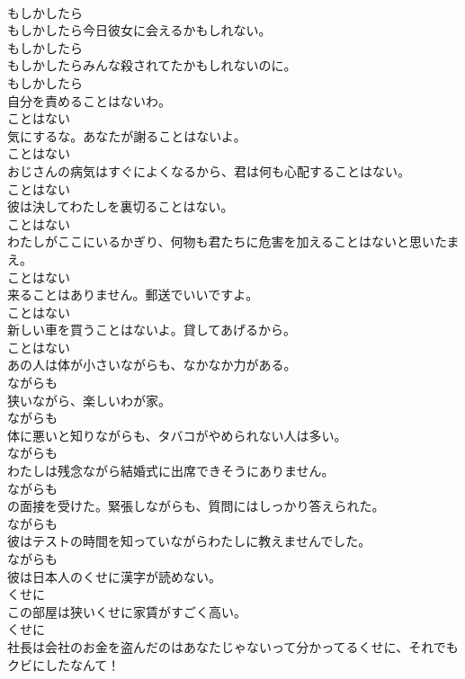 \documentclass[8pt]{extreport}
\begin{document}
\begin{CJK}{UTF8}{min}
\\	もしかしたら
\\	もしかしたら今日彼女に会えるかもしれない。	
\\	もしかしたら
\\	もしかしたらみんな殺されてたかもしれないのに。	
\\	もしかしたら
\\	自分を責めることはないわ。	
\\	ことはない
\\	気にするな。あなたが謝ることはないよ。	
\\	ことはない
\\	おじさんの病気はすぐによくなるから、君は何も心配することはない。	
\\	ことはない
\\	彼は決してわたしを裏切ることはない。	
\\	ことはない
\\	わたしがここにいるかぎり、何物も君たちに危害を加えることはないと思いたまえ。	
\\	ことはない
\\	来ることはありません。郵送でいいですよ。	
\\	ことはない
\\	新しい車を買うことはないよ。貸してあげるから。	
\\	ことはない
\\	あの人は体が小さいながらも、なかなか力がある。	
\\	ながらも
\\	狭いながら、楽しいわが家。	
\\	ながらも
\\	体に悪いと知りながらも、タバコがやめられない人は多い。	
\\	ながらも
\\	わたしは残念ながら結婚式に出席できそうにありません。	
\\	ながらも
\\	の面接を受けた。緊張しながらも、質問にはしっかり答えられた。	
\\	ながらも
\\	彼はテストの時間を知っていながらわたしに教えませんでした。	
\\	ながらも
\\	彼は日本人のくせに漢字が読めない。	
\\	くせに
\\	この部屋は狭いくせに家賃がすごく高い。	
\\	くせに
\\	社長は会社のお金を盗んだのはあなたじゃないって分かってるくせに、それでもクビにしたなんて！	

\end{CJK}
\end{document}
